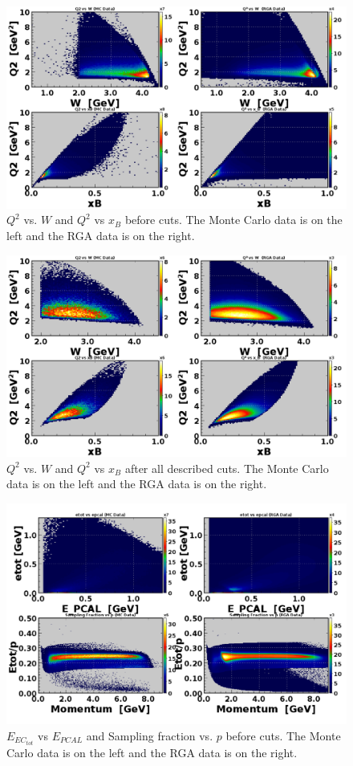 \newpage
\begin{figure}[h!]
	\centering
	\includegraphics[width=0.9\linewidth]{figures/rga/uncut/2Dkin2.png}
	\caption{$Q^2$ vs. $W$ and $Q^2$ vs $x_B$ before cuts. The Monte Carlo data is on the left and the RGA data is on the right.}
	\label{fig:rga_2Dkin2_uncut}
\end{figure}

\begin{figure}[h!]
	\centering
	\includegraphics[width=0.9\linewidth]{figures/rga/2Dkin2.png}
	\caption{$Q^2$ vs. $W$ and $Q^2$ vs $x_B$ after all described cuts. The Monte Carlo data is on the left and the RGA data is on the right.}
	\label{fig:rga_2Dkin2}
\end{figure}

\newpage
\begin{figure}[h!]
	\centering
	\includegraphics[width=0.9\linewidth]{figures/rga/uncut/sampFrac.png}
	\caption{$E_{EC_{tot}}$ vs $E_{PCAL}$ and Sampling fraction vs. $p$ before cuts. The Monte Carlo data is on the left and the RGA data is on the right.}
	\label{fig:rga_sampFrac_uncut}
\end{figure}

